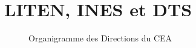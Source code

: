\chapter{LITEN, INES et DTS}

\begin{figure}[H]
    \centering
    
    \caption{Organigramme des Directions du CEA}
    \label{fig:organigramme-type}
\end{figure}